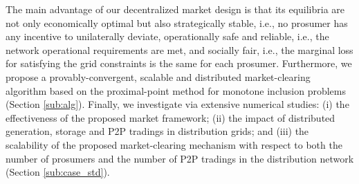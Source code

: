 \documentclass{IEEEtran}  %
\newcommand{\red}{\textcolor{red}}
\newcommand{\0}{\mathbf{0}}
\newcommand{\1}{\mathbf{1}}
\begin{document}
%
{
The main advantage of our decentralized market design is that its equilibria are not only economically optimal but also strategically stable, i.e., no prosumer has any incentive to unilaterally deviate, operationally safe and reliable, i.e., the network operational requirements are met, and socially fair, i.e., the marginal loss for satisfying the grid constraints is the same for each prosumer. 
%
%
Furthermore, we propose a provably-convergent, scalable and distributed market-clearing algorithm based on the proximal-point method for monotone inclusion problems	\cite[\S~23]{bauschke2011convex} (Section \ref{sub:alg}). 
Finally, we investigate via extensive numerical studies: (i)  the effectiveness of the proposed market framework; (ii) the impact of distributed generation, storage and P2P tradings in distribution grids; and (iii) the scalability of the proposed market-clearing mechanism with respect to both the number of prosumers and the number of P2P tradings in the distribution network (Section \ref{sub:case_std}).
}

\smallskip
\end{document}
